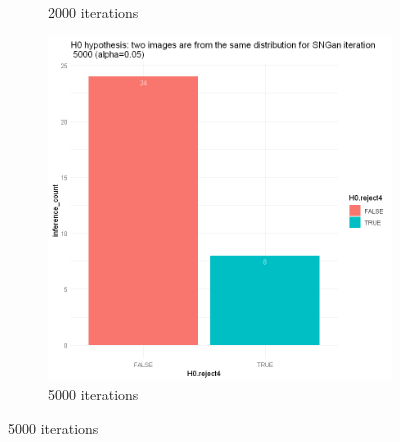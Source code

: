 \documentclass{article}
\begin{document}
\begin{figure}[h!]
\begin{subfigure}[b]{0.3\textwidth}
         \caption{2000 iterations}
     \end{subfigure}
     \hfill
     \begin{subfigure}[b]{0.3\textwidth}
         \centering
         \includegraphics[width=\textwidth]{kmmd_figures/sngan_flower_5000.png}
         \caption{5000 iterations}
     \end{subfigure}
\end{figure}
\end{document}
